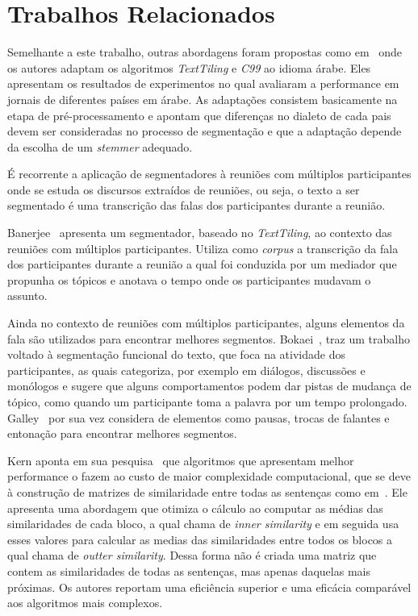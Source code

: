 \section{Trabalhos Relacionados}
	\label{sec:trabalhos}


Semelhante a este trabalho, outras abordagens foram propostas como em~\cite{CHAIBI2014} onde os autores adaptam os algoritmos \textit{TextTiling} e \textit{C99} ao idioma árabe. Eles apresentam os resultados de experimentos no qual avaliaram a performance em jornais de diferentes países em árabe. As adaptações consistem basicamente na etapa de pré-processamento e apontam que diferenças no dialeto de cada pais devem ser consideradas no processo de segmentação e que a adaptação depende da escolha de um \textit{stemmer} adequado.

É recorrente a aplicação de segmentadores à reuniões com múltiplos participantes onde se estuda os discursos extraídos de reuniões, ou seja, o texto a ser segmentado é uma transcrição das falas dos participantes durante a reunião.
%


Banerjee~\cite{Banerjee2006} apresenta um segmentador, baseado no  \textit{TextTiling}, ao contexto das reuniões com múltiplos participantes. Utiliza como \textit{corpus} a transcrição da fala dos participantes durante a reunião a qual foi conduzida por um mediador que propunha os tópicos e anotava o tempo onde os participantes mudavam o assunto. 

Ainda no contexto de reuniões com múltiplos participantes, alguns elementos da fala são utilizados para encontrar melhores segmentos.
%
Bokaei~\cite{Bokaei2015}, traz um trabalho voltado à segmentação funcional do texto, que foca na atividade dos participantes, as quais categoriza, por exemplo em diálogos, discussões e monólogos e sugere que alguns comportamentos podem dar pistas de mudança de tópico, como quando um participante toma a palavra por um tempo prolongado. 
Galley~\cite{Galley2003} por sua vez considera de elementos como pausas, trocas de falantes e entonação para encontrar melhores segmentos.

Kern aponta em sua pesquisa~\cite{Kern2009} que algoritmos que apresentam melhor performance o fazem ao custo de maior complexidade computacional, que se deve à construção de matrizes de similaridade entre todas as sentenças como em~\cite{Choi2000}. Ele apresenta uma abordagem que otimiza o cálculo ao computar as médias das similaridades de cada bloco, a qual chama de \textit{inner similarity} e em seguida usa esses valores para calcular as medias das similaridades entre todos os blocos a qual chama de \textit{outter similarity}. Dessa forma não é criada uma matriz que contem as similaridades de todas as sentenças, mas apenas daquelas mais próximas. Os autores reportam uma eficiência superior e uma eficácia comparável aos algoritmos mais complexos.


